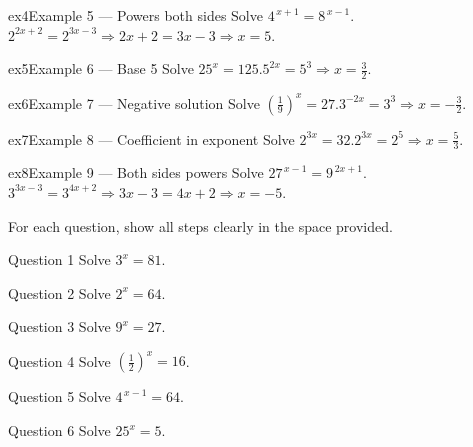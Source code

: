 \documentclass[11pt]{article}
\begin{document}
\begin{example}{ex4}{Example 5 --- Powers both sides}
Solve $4^{\,x+1}=8^{\,x-1}$.\soln $2^{2x+2}=2^{3x-3}\Rightarrow 2x+2=3x-3\Rightarrow x=5$.
\end{example}

\begin{example}{ex5}{Example 6 --- Base 5}
Solve $25^{x}=125$.\soln $5^{2x}=5^3\Rightarrow x=\tfrac32$.
\end{example}

\begin{example}{ex6}{Example 7 --- Negative solution}
Solve $\left(\tfrac19\right)^{x}=27$.\soln $3^{-2x}=3^3\Rightarrow x=-\tfrac32$.
\end{example}

\begin{example}{ex7}{Example 8 --- Coefficient in exponent}
Solve $2^{3x}=32$.\soln $2^{3x}=2^5\Rightarrow x=\tfrac53$.
\end{example}

\begin{example}{ex8}{Example 9 --- Both sides powers}
Solve $27^{\,x-1}=9^{\,2x+1}$.\soln $3^{3x-3}=3^{4x+2}\Rightarrow 3x-3=4x+2\Rightarrow x=-5$.
\end{example}

\clearpage
{}
For each question, show all steps clearly in the space provided.

\begin{qbox}{Question 1}
Solve $3^{x}=81$.\workspace{2.4cm}
\end{qbox}

\begin{qbox}{Question 2}
Solve $2^{x}=64$.\workspace{2.4cm}
\end{qbox}

\begin{qbox}{Question 3}
Solve $9^{x}=27$.\workspace{2.4cm}
\end{qbox}

\begin{qbox}{Question 4}
Solve $\left(\tfrac12\right)^{x}=16$.\workspace{2.4cm}
\end{qbox}

\begin{qbox}{Question 5}
Solve $4^{\,x-1}=64$.\workspace{2.4cm}
\end{qbox}

\begin{qbox}{Question 6}
Solve $25^{x}=5$.\workspace{2.4cm}
\end{qbox}
\end{document}

